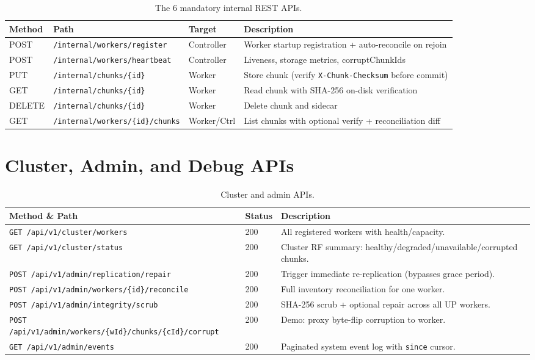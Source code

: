 \documentclass[12pt,a4paper]{report}
\begin{document}
\begin{table}[H]
  \centering
  \caption{The 6 mandatory internal REST APIs.}
  \label{tab:internal-apis}
  \begin{tabularx}{\textwidth}{lllX}
    \toprule
    \textbf{Method} & \textbf{Path} & \textbf{Target} & \textbf{Description} \\
    \midrule
    POST   & \texttt{/internal/workers/register}             & Controller & Worker startup registration + auto-reconcile on rejoin \\
    POST   & \texttt{/internal/workers/heartbeat}            & Controller & Liveness, storage metrics, corruptChunkIds \\
    PUT    & \texttt{/internal/chunks/\{id\}}               & Worker     & Store chunk (verify \texttt{X-Chunk-Checksum} before commit) \\
    GET    & \texttt{/internal/chunks/\{id\}}               & Worker     & Read chunk with SHA-256 on-disk verification \\
    DELETE & \texttt{/internal/chunks/\{id\}}               & Worker     & Delete chunk and sidecar \\
    GET    & \texttt{/internal/workers/\{id\}/chunks}       & Worker/Ctrl & List chunks with optional verify + reconciliation diff \\
    \bottomrule
  \end{tabularx}
\end{table}

\section{Cluster, Admin, and Debug APIs}

\begin{table}[H]
  \centering
  \caption{Cluster and admin APIs.}
  \label{tab:admin-apis}
  \begin{tabularx}{\textwidth}{llX}
    \toprule
    \textbf{Method \& Path} & \textbf{Status} & \textbf{Description} \\
    \midrule
    \texttt{GET /api/v1/cluster/workers}           & 200 & All registered workers with health/capacity. \\
    \texttt{GET /api/v1/cluster/status}            & 200 & Cluster RF summary: healthy/degraded/unavailable/corrupted chunks. \\
    \texttt{POST /api/v1/admin/replication/repair} & 200 & Trigger immediate re-replication (bypasses grace period). \\
    \texttt{POST /api/v1/admin/workers/\{id\}/reconcile} & 200 & Full inventory reconciliation for one worker. \\
    \texttt{POST /api/v1/admin/integrity/scrub}    & 200 & SHA-256 scrub + optional repair across all UP workers. \\
    \texttt{POST /api/v1/admin/workers/\{wId\}/chunks/\{cId\}/corrupt} & 200 & Demo: proxy byte-flip corruption to worker. \\
    \texttt{GET /api/v1/admin/events}              & 200 & Paginated system event log with \texttt{since} cursor. \\
    \bottomrule
  \end{tabularx}
\end{table}
\end{document}
